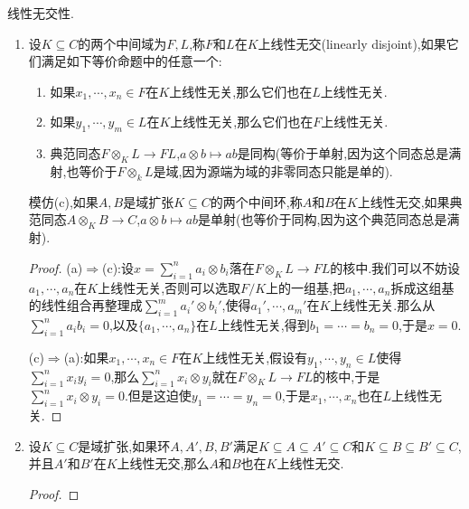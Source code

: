 线性无交性.
\begin{enumerate}
	\item 设$K\subseteq C$的两个中间域为$F,L$,称$F$和$L$在$K$上线性无交(linearly disjoint),如果它们满足如下等价命题中的任意一个:
	\begin{enumerate}
		\item 如果$x_1,\cdots,x_n\in F$在$K$上线性无关,那么它们也在$L$上线性无关.
		\item 如果$y_1,\cdots,y_m\in L$在$K$上线性无关,那么它们也在$F$上线性无关.
		\item 典范同态$F\otimes_KL\to FL$,$a\otimes b\mapsto ab$是同构(等价于单射,因为这个同态总是满射,也等价于$F\otimes_kL$是域,因为源端为域的非零同态只能是单的).
	\end{enumerate}

    模仿(c),如果$A,B$是域扩张$K\subseteq C$的两个中间环,称$A$和$B$在$K$上线性无交,如果典范同态$A\otimes_KB\to C$,$a\otimes b\mapsto ab$是单射(也等价于同构,因为这个典范同态总是满射).
    \begin{proof}
    	
    	(a)$\Rightarrow$(c):设$x=\sum_{i=1}^na_i\otimes b_i$落在$F\otimes_KL\to FL$的核中.我们可以不妨设$a_1,\cdots,a_n$在$K$上线性无关,否则可以选取$F/K$上的一组基,把$a_1,\cdots,a_n$拆成这组基的线性组合再整理成$\sum_{i=1}^ma_i'\otimes b_i'$,使得$a_1',\cdots,a_m'$在$K$上线性无关.那么从$\sum_{i=1}^na_ib_i=0$,以及$\{a_1,\cdots,a_n\}$在$L$上线性无关,得到$b_1=\cdots=b_n=0$,于是$x=0$.
    	
    	\qquad
    	
    	(c)$\Rightarrow$(a):如果$x_1,\cdots,x_n\in F$在$K$上线性无关,假设有$y_1,\cdots,y_n\in L$使得$\sum_{i=1}^nx_iy_i=0$,那么$\sum_{i=1}^nx_i\otimes y_i$就在$F\otimes_KL\to FL$的核中,于是$\sum_{i=1}^nx_i\otimes y_i=0$.但是这迫使$y_1=\cdots=y_n=0$,于是$x_1,\cdots,x_n$也在$L$上线性无关.
    \end{proof}
    \item 设$K\subseteq C$是域扩张,如果环$A,A',B,B'$满足$K\subseteq A\subseteq A'\subseteq C$和$K\subseteq B\subseteq B'\subseteq C$,并且$A'$和$B'$在$K$上线性无交,那么$A$和$B$也在$K$上线性无交.
    \begin{proof}
    	

\end{proof}
\end{enumerate}
